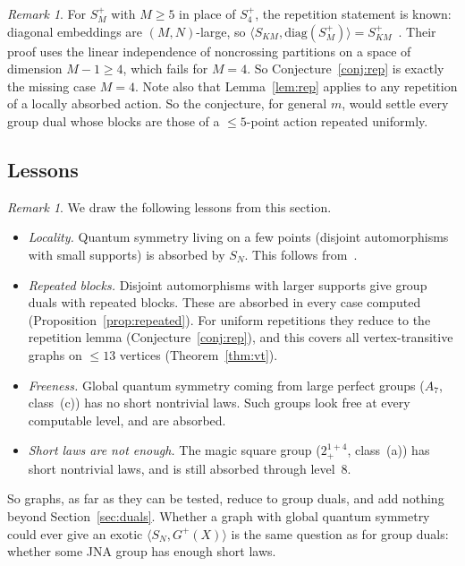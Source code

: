 \documentclass[11pt]{amsart}
\theoremstyle{definition}
\theoremstyle{remark}
\newtheorem{remark}[theorem]{Remark}
\theoremstyle{plain}
\numberwithin{equation}{section}
\numberwithin{table}{section}
\begin{document}
\begin{remark}
For $S_M^+$ with $M\ge5$ in place of $S_4^+$, the repetition statement is known: diagonal embeddings are $(M,N)$-large, so $\langle S_{KM},\mathrm{diag}(S_M^+)\rangle=S_{KM}^+$~\cite[Ex.~3.9, Prop.~3.10]{bcf}. Their proof uses the linear independence of noncrossing partitions on a space of dimension $M-1\ge4$, which fails for $M=4$. So Conjecture~\ref{conj:rep} is exactly the missing case $M=4$. Note also that Lemma~\ref{lem:rep} applies to any repetition of a locally absorbed action. So the conjecture, for general $m$, would settle every group dual whose blocks are those of a $\le5$-point action repeated uniformly.
\end{remark}

\subsection{Lessons}

\begin{remark}
We draw the following lessons from this section.
\begin{itemize}
\item \emph{Locality.} Quantum symmetry living on a few points (disjoint automorphisms with small supports) is absorbed by $S_N$. This follows from~\cite{bcf}.
\item \emph{Repeated blocks.} Disjoint automorphisms with larger supports give group duals with repeated blocks. These are absorbed in every case computed (Proposition~\ref{prop:repeated}). For uniform repetitions they reduce to the repetition lemma (Conjecture~\ref{conj:rep}), and this covers all vertex-transitive graphs on $\le13$ vertices (Theorem~\ref{thm:vt}).
\item \emph{Freeness.} Global quantum symmetry coming from large perfect groups ($A_7$, class~(c)) has no short nontrivial laws. Such groups look free at every computable level, and are absorbed.
\item \emph{Short laws are not enough.} The magic square group ($2^{1+4}_+$, class~(a)) has short nontrivial laws, and is still absorbed through level~$8$.
\end{itemize}
So graphs, as far as they can be tested, reduce to group duals, and add nothing beyond Section~\ref{sec:duals}. Whether a graph with global quantum symmetry could ever give an exotic $\langle S_N,G^+(X)\rangle$ is the same question as for group duals: whether some JNA group has enough short laws.
\end{remark}
\end{document}

